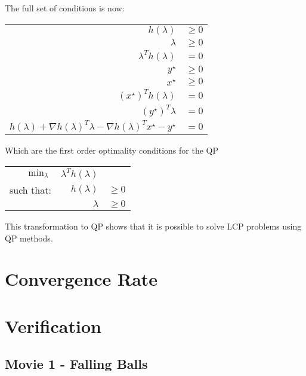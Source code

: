 \documentclass[10pt,oneside,a4paper,final,english]{memoir}
\begin{document}
The full set of conditions is now:
\begin{center}\begin{tabular}{rl}
$h(\lambda)$ & $\geq 0$ \\
$\lambda$ & $\geq 0$\\
$\lambda^T h(\lambda)$ & $= 0$\\

$y^\star $&$\geq 0$ \\
$x^\star $&$\geq 0$ \\
$(x^\star)^T h(\lambda)$&$= 0$ \\

$(y^\star)^T \lambda $&$= 0$ \\

$h(\lambda) + \nabla h(\lambda)^T \lambda - \nabla h(\lambda)^T
x^\star - y^\star $&$= 0$
\end{tabular}\end{center}

Which are the first order optimality conditions for the QP
\begin{center}\begin{tabular}{rrl}
$\min_\lambda$ & $\lambda^T h(\lambda)$ & \\
such that: & $h(\lambda)$ & $\geq 0$ \\
           & $\lambda $ & $\geq 0$
\end{tabular}\end{center}

This transformation to QP shows that it is possible to solve LCP
problems using QP methods.



\section{Convergence Rate}


\section{Verification}


\subsection{Movie 1 - Falling Balls}



\end{document}
